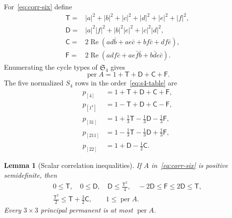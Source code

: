 \documentclass[11pt]{article}
\newtheorem{lemma}[theorem]{Lemma}
\theoremstyle{definition}
\newcommand{\Sn}{\mathfrak S}
\newcommand{\per}{\operatorname{per}}
\newcommand{\Rea}{\operatorname{Re}}
\begin{document}
For~\eqref{eq:corr-six} define
\begin{align}
 \mathsf T={}&|a|^2+|b|^2+|c|^2+|d|^2+|e|^2+|f|^2,\label{eq:T}\\
 \mathsf D={}&|a|^2|f|^2+|b|^2|e|^2+|c|^2|d|^2,\label{eq:D}\\
 \mathsf C={}&2\Rea(a d\bar b+a e\bar c+b f\bar c+d f\bar e),\label{eq:C}\\
 \mathsf F={}&2\Rea(a d f\bar c+a e\bar f\bar b+b\bar d e\bar c).
 \label{eq:F}
\end{align}
Enumerating the cycle types of $\Sn_4$ gives
\begin{equation}\label{eq:per-aggregate}
 \per A=1+\mathsf T+\mathsf D+\mathsf C+\mathsf F.
\end{equation}
The five normalized $S_4$ rows in the order~\eqref{eq:s4-table} are
\begin{align}
 p_{[4]}&=1+\mathsf T+\mathsf D+\mathsf C+\mathsf F,\nonumber\\
 p_{[1^4]}&=1-\mathsf T+\mathsf D+\mathsf C-\mathsf F,\nonumber\\
 p_{[31]}&=1+\tfrac13\mathsf T-\tfrac13\mathsf D-\tfrac13\mathsf F,\label{eq:s4-rows}\\
 p_{[211]}&=1-\tfrac13\mathsf T-\tfrac13\mathsf D+\tfrac13\mathsf F,\nonumber\\
 p_{[22]}&=1+\mathsf D-\tfrac12\mathsf C.\nonumber
\end{align}

\begin{lemma}[Scalar correlation inequalities]\label{lem:scalar-toolbox}
If $A$ in~\eqref{eq:corr-six} is positive semidefinite, then
\begin{gather}
 0\leq\mathsf T,\quad 0\leq\mathsf D,\quad
 \mathsf D\leq\frac{\mathsf T^2}{4},\quad
 -2\mathsf D\leq\mathsf F\leq2\mathsf D\leq\mathsf T,
 \label{eq:scalar-basic}\\
 \frac{\mathsf T^2}{2}\leq\mathsf T+\frac32\mathsf C,
 \qquad 1\leq\per A.\label{eq:moment-bound}
\end{gather}
Every $3\times3$ principal permanent is at most $\per A$.
\end{lemma}
\end{document}
